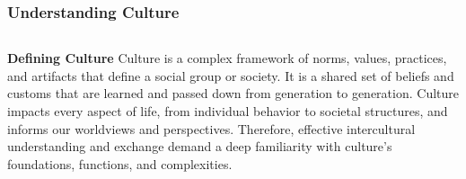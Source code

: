 \documentclass[5pt]{beamer}
\begin{document}
\begin{frame}
\frametitle{Understanding Culture}
\begin{columns}
\begin{column}{0.7\textwidth}
\begin{block}{\textbf{Defining Culture}}
Culture is a complex framework of norms, values, practices, and artifacts that define a social group or society. It is a shared set of beliefs and customs that are learned and passed down from generation to generation. Culture impacts every aspect of life, from individual behavior to societal structures, and informs our worldviews and perspectives. Therefore, effective intercultural understanding and exchange demand a deep familiarity with culture's foundations, functions, and complexities.
\end{block}
\end{column}
\end{columns}
\end{frame}
\end{document}
